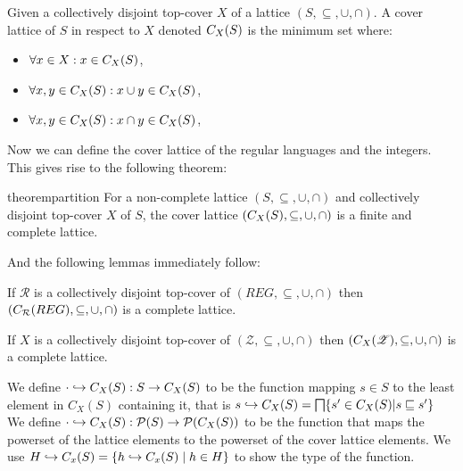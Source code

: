 \begin{definition}\label{def:coverlattice}
Given a collectively disjoint top-cover $X$ of a lattice $(S, \subseteq, \cup, \cap)$.
A cover lattice of $S$ in respect to $X$ denoted $C_{X}(S)$ is the minimum set where:
\begin{itemize}
    \item $\forall x \in X: x \in C_{X}(S)$,
    \item $\forall x, y \in C_{X}(S) : x \cup y \in C_{X}(S)$,
    \item $\forall x, y \in C_{X}(S) : x \cap y \in C_{X}(S)$,
\end{itemize}
\end{definition}

Now we can define the cover lattice of the regular languages and the integers.
This gives rise to the following theorem:

\begin{restatable}{theorem}{partition}\label{thm:partition}
For a non-complete lattice $(S, \subseteq, \cup, \cap)$ and collectively disjoint top-cover $X$ of $S$, the cover lattice $(C_{X}(S), \subseteq, \cup, \cap)$ is a finite and complete lattice.
\end{restatable}

And the following lemmas immediately follow:

\begin{lemma}
    If $\mathcal{R}$ is a collectively disjoint top-cover of $(REG, \subseteq, \cup, \cap)$ then $(C_{\mathcal{R}}(REG), \subseteq, \cup, \cap)$ is a complete lattice.
\end{lemma}

\begin{lemma}
    If $X$ is a collectively disjoint top-cover of $(\mathscr{Z}, \subseteq, \cup, \cap)$ then $(C_{X}(\mathscr{Z}), \subseteq, \cup, \cap)$ is a complete lattice.
\end{lemma}

\begin{definition}
    We define $\cdot \hookrightarrow C_X(S):S\rightarrow C_X(S)$ to be the function mapping $s\in S$ to the least element in $C_X(S)$ containing it, that is $s \into C_X(S)=\bigsqcap\{s'\in C_X(S)|s\sqsubseteq s'\}$
    \\

    We define $\cdot \hookrightarrow C_X(S):\mathcal{P}(S)\rightarrow \mathcal{P}(C_X(S))$ to be the function that maps the powerset of the lattice elements to the powerset of the cover lattice elements.
    We use $H \hookrightarrow C_x (S) = \{h \hookrightarrow C_x (S) \mid h \in H\}$ to show the type of the function.
\end{definition}

